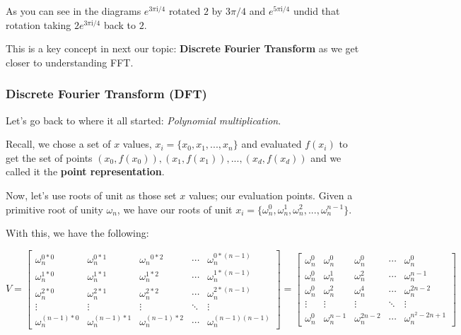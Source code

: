 \documentclass[11pt]{article}
\begin{document}
    As you can see in the diagrams \(e^{{3\pi\mathrm{i}}/4}\) rotated \(2\)
by \({3\pi}/4\) and \(e^{{5\pi\mathrm{i}}/4}\) undid that rotation
taking \(2e^{{3\pi\mathrm{i}}/4}\) back to \(2\).

This is a key concept in next our topic: \textbf{Discrete Fourier
Transform} as we get closer to understanding FFT.

    \subsubsection{Discrete Fourier Transform
(DFT)}\label{discrete-fourier-transform-dft}

    Let's go back to where it all started: \emph{Polynomial multiplication}.

Recall, we chose a set of \(x\) values, \(x_i = \{x_0, x_1,..., x_n\}\)
and evaluated \(f(x_i)\) to get the set of points
\((x_0, f(x_0)), (x_1, f(x_1)),...,(x_d, f(x_d))\) and we called it the
\textbf{point representation}.

Now, let's use roots of unit as those set \(x\) values; our evaluation
points. Given a primitive root of unity \(\omega_n\), we have our roots
of unit
\(x_i = \{\omega_n^0, \omega_n^1, \omega_n^2, ..., \omega_n^{n - 1} \}\).

With this, we have the following:

\[ V = \begin{bmatrix} \omega_n^{0*0} & \omega_n^{0*1} & {\omega_n}^{0*2} & \cdots & \omega_n^{0*(n - 1)} \\ \omega_n^{1*0} & \omega_n^{1*1} & \omega_n^{1*2} & \cdots & \omega_n^{1*(n - 1)} \\ \omega_n^{2*0} & \omega_n^{2*1} & \omega_n^{2*2} & \cdots & \omega_n^{2*(n - 1)} \\[0.3em]\vdots & \vdots & \vdots & \ddots & \vdots \\[0.3em]\omega_n^{(n - 1)*0} & \omega_n^{(n - 1)*1} & \omega_n^{(n - 1)*2} & \cdots & \omega_n^{(n - 1)(n - 1)} \end{bmatrix} = \begin{bmatrix}\omega_n^0 & \omega_n^0 & \omega_n^0 & \cdots & \omega_n^0 \\ \omega_n^0 & \omega_n^1 & \omega_n^2 & \cdots & \omega_n^{n - 1} \\ \omega_n^0 & \omega_n^2 & \omega_n^4 & \cdots & \omega_n^{2n - 2} \\[0.3em]\vdots & \vdots & \vdots & \ddots & \vdots \\[0.3em] \omega_n^0 & \omega_n^{n - 1} & \omega_n^{2n - 2} & \cdots & \omega_n^{n^2 - 2n + 1} \end{bmatrix}\]
\end{document}
